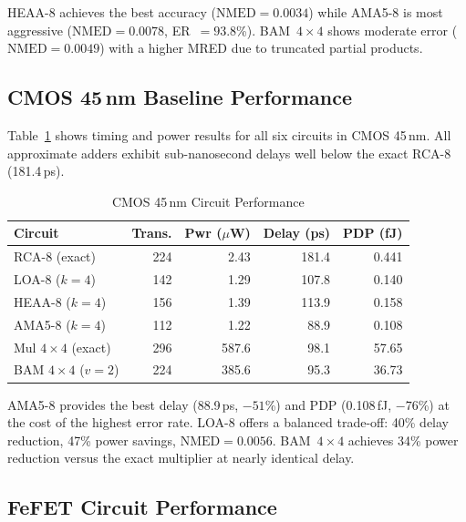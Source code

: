 \documentclass[letterpaper, 10 pt, conference]{ieeeconf}  %
\newcommand{\NMED}{\mathrm{NMED}}
\begin{document}
HEAA-8 achieves the best accuracy ($\NMED = 0.0034$) while AMA5-8 is most
aggressive ($\NMED = 0.0078$, ER~$= 93.8$\%). BAM~$4\times4$ shows moderate
error ($\NMED = 0.0049$) with a higher MRED due to truncated partial products.

\subsection{CMOS 45\,nm Baseline Performance}

Table~\ref{tab:cmos} shows timing and power results for all six circuits in
CMOS 45\,nm. All approximate adders exhibit sub-nanosecond delays well below
the exact RCA-8 (181.4\,ps).

\begin{table}[t]
  \caption{CMOS 45\,nm Circuit Performance}
  \label{tab:cmos}
  \begin{center}
    \small
    \begin{tabular}{lrrrr}
      \toprule
      \textbf{Circuit} & \textbf{Trans.} & \textbf{Pwr ($\mu$W)} & \textbf{Delay (ps)} & \textbf{PDP (fJ)} \\
      \midrule
      RCA-8 (exact)            & 224 &   2.43 & 181.4 &  0.441 \\
      LOA-8 ($k{=}4$)         & 142 &   1.29 & 107.8 &  0.140 \\
      HEAA-8 ($k{=}4$)        & 156 &   1.39 & 113.9 &  0.158 \\
      AMA5-8 ($k{=}4$)        & 112 &   1.22 &  88.9 &  0.108 \\
      Mul $4{\times}4$ (exact) & 296 & 587.6  &  98.1 & 57.65  \\
      BAM $4{\times}4$ ($v{=}2$) & 224 & 385.6 & 95.3 & 36.73  \\
      \bottomrule
    \end{tabular}
  \end{center}
\end{table}

AMA5-8 provides the best delay (88.9\,ps, $-51$\%) and PDP (0.108\,fJ,
$-76$\%) at the cost of the highest error rate. LOA-8 offers a balanced
trade-off: 40\% delay reduction, 47\% power savings, $\NMED = 0.0056$.
BAM~$4\times4$ achieves 34\% power reduction versus the exact multiplier at
nearly identical delay.

\subsection{FeFET Circuit Performance}
\end{document}
